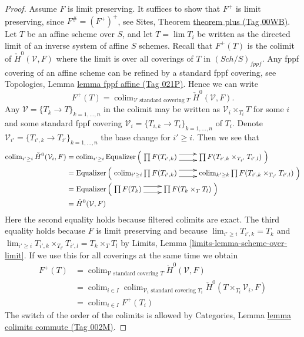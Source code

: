 \documentclass{amsart}
\theoremstyle{plain}
\theoremstyle{definition}
\theoremstyle{remark}
\numberwithin{equation}{subsection}
\def\lim{\mathop{\mathrm{lim}}\nolimits}
\def\colim{\mathop{\mathrm{colim}}\nolimits}
\def\Sch{\mathit{Sch}}
\begin{document}
\begin{proof}
Assume $F$ is limit preserving.
It suffices to show that $F^+$ is limit preserving, since
$F^\# = (F^+)^+$, see
Sites, Theorem \href{https://stacks.math.columbia.edu/tag/00WB}{theorem plus (Tag 00WB)}.
Let $T$ be an affine scheme over $S$, and let $T = \lim T_i$ be written
as the directed limit of an inverse system of affine $S$ schemes.
Recall that $F^+(T)$ is the colimit of $\check H^0(\mathcal{V}, F)$
where the limit is over all coverings of $T$ in $(\Sch/S)_{fppf}$.
Any fppf covering of an affine scheme can be refined by a standard
fppf covering, see
Topologies, Lemma \href{https://stacks.math.columbia.edu/tag/021P}{lemma fppf affine (Tag 021P)}.
Hence we can write
$$
F^+(T)
=
\colim_{\mathcal{V}\text{ standard covering }T}
\check H^0(\mathcal{V}, F).
$$
Any $\mathcal{V} = \{T_k \to T\}_{k = 1, \ldots, n}$
in the colimit may be written as
$\mathcal{V}_i \times_{T_i} T$ for some $i$ and some standard fppf covering
$\mathcal{V}_i = \{T_{i, k} \to T_i\}_{k = 1, \ldots, n}$ of $T_i$.
Denote $\mathcal{V}_{i'} = \{T_{i', k} \to T_{i'}\}_{k = 1, \ldots, n}$
the base change for $i' \geq i$. Then we see that
\begin{align*}
\colim_{i' \geq i} \check H^0(\mathcal{V}_i, F)
& =
\colim_{i' \geq i}
\text{Equalizer}
\left(
\xymatrix{
\prod F(T_{i', k})
\ar@<1ex>[r] \ar@<-1ex>[r] &
\prod F(T_{i', k} \times_{T_{i'}} T_{i', l})
}
\right)
\\
& =
\text{Equalizer}
\left(
\xymatrix{
\colim_{i' \geq i}
\prod F(T_{i', k})
\ar@<1ex>[r] \ar@<-1ex>[r] &
\colim_{k' \geq k}
\prod F(T_{i', k} \times_{T_{i'}} T_{i', l})
}
\right)
\\
& =
\text{Equalizer}
\left(
\xymatrix{
\prod F(T_k)
\ar@<1ex>[r] \ar@<-1ex>[r] &
\prod F(T_k \times_T T_l)
}
\right)
\\
& =
\check H^0(\mathcal{V}, F)
\end{align*}
Here the second equality holds because filtered colimits are exact.
The third equality holds because $F$ is limit preserving and because
$\lim_{i' \geq i} T_{i', k} = T_k$ and
$\lim_{i' \geq i} T_{i', k} \times_{T_{i'}} T_{i', l} = T_k \times_T T_l$
by Limits, Lemma \ref{limits-lemma-scheme-over-limit}.
If we use this for all coverings at the same time we obtain
\begin{align*}
F^+(T)
& =
\colim_{\mathcal{V}\text{ standard covering }T} \check H^0(\mathcal{V}, F) \\
& =
\colim_{i \in I}
\colim_{\mathcal{V}_i\text{ standard covering }T_i}
\check H^0(T \times_{T_i}\mathcal{V}_i, F) \\
& =
\colim_{i \in I} F^+(T_i)
\end{align*}
The switch of the order of the colimits is allowed by
Categories, Lemma \href{https://stacks.math.columbia.edu/tag/002M}{lemma colimits commute (Tag 002M)}.
\end{proof}
\end{document}
